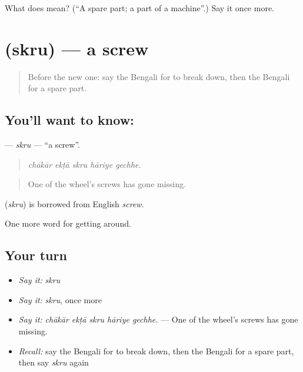 \begin{tcolorbox}[breakable,colback=teal!4,colframe=teal!35!black,title={Before you move on}]
What does  mean? (\textquotedblleft{}A spare part; a part of a machine\textquotedblright{}.) Say it once more.
\end{tcolorbox}
\section[\texorpdfstring{\bn{স্ক্রু} (skru)}{স্ক্রু (skru)}]{ (skru) — a screw}

\label{lesson:BN-C394-skru}



\begin{quote}
Before the new one: say the Bengali for to break down, then the Bengali for a spare part.
\end{quote}

\subsection*{You'll want to know: }
\textbf{} — \emph{skru} — \textquotedblleft{}a screw\textquotedblright{}.

\begin{quote}
    
\end{quote}

\begin{quote}
\emph{chākār ekṭā skru hāriye gechhe.}
\end{quote}

\begin{quote}
One of the wheel's screws has gone missing.
\end{quote}

\begin{cousinweb}
\textbf{} (\emph{skru}) is borrowed from English \emph{screw}.
\end{cousinweb}

\begin{grammarlens}[title={What you've built}]
One more word for getting around.
\end{grammarlens}

\subsection*{Your turn}
\begin{itemize}
\raggedright
  \item \emph{Say it:} \emph{skru}
  \item \emph{Say it:} \emph{skru}, once more
  \item \emph{Say it:} \emph{chākār ekṭā skru hāriye gechhe.} — One of the wheel's screws has gone missing.
  \item \emph{Recall:} say the Bengali for to break down, then the Bengali for a spare part, then say \emph{skru} again
\end{itemize}

